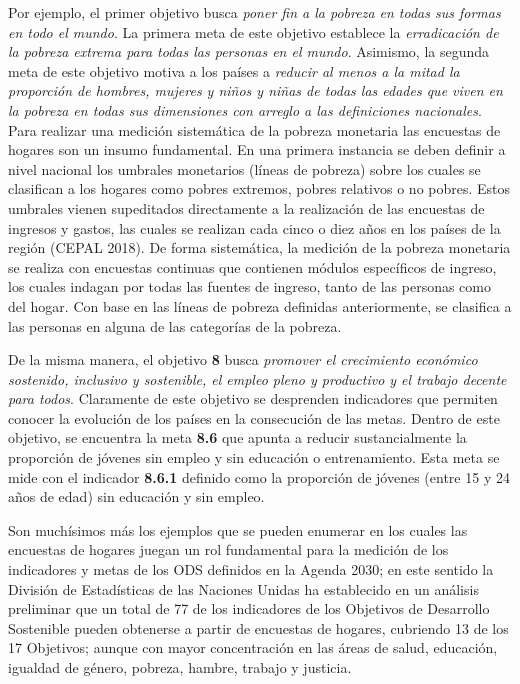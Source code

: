 \documentclass[
  12pt,
  spanish,
]{book}
\begin{document}
Por ejemplo, el primer objetivo busca \emph{poner fin a la pobreza en todas sus formas en todo el mundo}. La primera meta de este objetivo establece la \emph{erradicación de la pobreza extrema para todas las personas en el mundo}. Asimismo, la segunda meta de este objetivo motiva a los países a \emph{reducir al menos a la mitad la proporción de hombres, mujeres y niños y niñas de todas las edades que viven en la pobreza en todas sus dimensiones con arreglo a las definiciones nacionales}. Para realizar una medición sistemática de la pobreza monetaria las encuestas de hogares son un insumo fundamental. En una primera instancia se deben definir a nivel nacional los umbrales monetarios (líneas de pobreza) sobre los cuales se clasifican a los hogares como pobres extremos, pobres relativos o no pobres. Estos umbrales vienen supeditados directamente a la realización de las encuestas de ingresos y gastos, las cuales se realizan cada cinco o diez años en los países de la región (CEPAL 2018). De forma sistemática, la medición de la pobreza monetaria se realiza con encuestas continuas que contienen módulos específicos de ingreso, los cuales indagan por todas las fuentes de ingreso, tanto de las personas como del hogar. Con base en las líneas de pobreza definidas anteriormente, se clasifica a las personas en alguna de las categorías de la pobreza.

De la misma manera, el objetivo \textbf{8} busca \emph{promover el crecimiento económico sostenido, inclusivo y sostenible, el empleo pleno y productivo y el trabajo decente para todos}. Claramente de este objetivo se desprenden indicadores que permiten conocer la evolución de los países en la consecución de las metas. Dentro de este objetivo, se encuentra la meta \textbf{8.6} que apunta a reducir sustancialmente la proporción de jóvenes sin empleo y sin educación o entrenamiento. Esta meta se mide con el indicador \textbf{8.6.1} definido como la proporción de jóvenes (entre 15 y 24 años de edad) sin educación y sin empleo.

Son muchísimos más los ejemplos que se pueden enumerar en los cuales las encuestas de hogares juegan un rol fundamental para la medición de los indicadores y metas de los ODS definidos en la Agenda 2030; en este sentido la División de Estadísticas de las Naciones Unidas ha establecido en un análisis preliminar que un total de 77 de los indicadores de los Objetivos de Desarrollo Sostenible pueden obtenerse a partir de encuestas de hogares, cubriendo 13 de los 17 Objetivos; aunque con mayor concentración en las áreas de salud, educación, igualdad de género, pobreza, hambre, trabajo y justicia.
\end{document}
